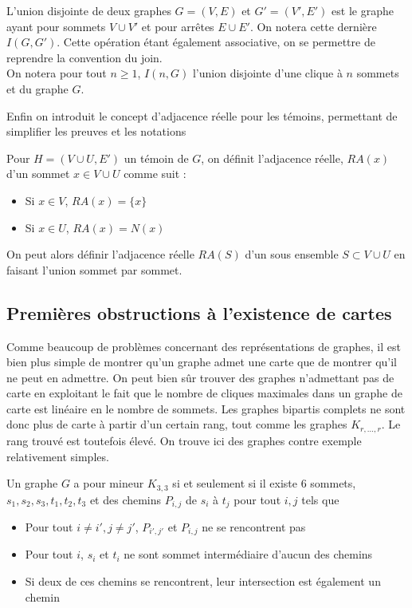 \documentclass{scrartcl}
\begin{document}
\begin{flushleft}
\begin{def*}
    L'union disjointe de deux graphes $G = (V, E)$ et $G' = (V', E')$ est le graphe ayant pour sommets $V \cup V'$ et pour arrêtes
    $E \cup E'$. On notera cette dernière $I(G, G')$. Cette opération étant également associative, on se permettre de reprendre la
    convention du join.\\
    On notera pour tout $n \geq 1$, $I(n, G)$ l'union disjointe d'une clique à $n$ sommets et du graphe $G$.
\end{def*}

Enfin on introduit le concept d'adjacence réelle pour les témoins, permettant de simplifier les preuves et les notations

\begin{def*}
    Pour $H = (V \cup U, E')$ un témoin de $G$, on définit l'adjacence réelle, $RA(x)$ d'un sommet $x \in V \cup U$ comme suit :
    \begin{itemize}
        \item Si $x \in V$, $RA(x) = \{x\}$
        \item Si $x \in U$, $RA(x) = N(x)$
    \end{itemize}
    On peut alors définir l'adjacence réelle $RA(S)$ d'un sous ensemble $S \subset V \cup U$ en faisant l'union sommet par sommet.
\end{def*}

\subsection{Premières obstructions à l'existence de cartes}

Comme beaucoup de problèmes concernant des représentations de graphes, il est bien plus simple de montrer qu'un graphe admet une
carte que de montrer qu'il ne peut en admettre. On peut bien sûr trouver des graphes n'admettant pas de carte en exploitant
le fait que le nombre de cliques maximales dans un graphe de carte est linéaire en le nombre de sommets. Les graphes bipartis
complets ne sont donc plus de carte à partir d'un certain rang, tout comme les graphes $K_{r,...,r}$. Le rang trouvé est toutefois
élevé. On trouve ici des graphes contre exemple relativement simples.

\begin{lem}\label{CNSK33}
    Un graphe $G$ a pour mineur $K_{3,3}$ si et seulement si il existe $6$ sommets, $s_1, s_2, s_3, t_1, t_2, t_3$ et des chemins
    $P_{i,j}$ de $s_i$ à $t_j$ pour tout $i, j$ tels que
    \begin{itemize}
        \item Pour tout $i \neq i', j \neq j'$, $P_{i',j'}$ et $P_{i, j}$ ne se rencontrent pas
        \item Pour tout $i$, $s_i$ et $t_i$ ne sont sommet intermédiaire d'aucun des chemins
        \item Si deux de ces chemins se rencontrent, leur intersection est également un chemin
    \end{itemize}
\end{lem}


\end{flushleft}
\end{document}
